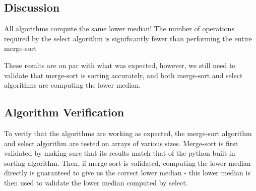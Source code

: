 \documentclass[11pt]{article}
\begin{document}
    \subsection{Discussion}\label{discussion}

All algorithms compute the same lower median! The number of operations
required by the select algorithm is significantly fewer than performing
the entire merge-sort

These results are on par with what was expected, however, we still need
to validate that merge-sort is sorting accurately, and both merge-sort
and select algorithms are computing the lower median.

\subsection{Algorithm Verification}\label{algorithm-verification}

To verify that the algorithms are working as expected, the merge-sort
algorithm and select algorithm are tested on arrays of various sizes.
Merge-sort is first validated by making sure that its results match that
of the python built-in sorting algorithm. Then, if merge-sort is
validated, computing the lower median directly is guaranteed to give us
the correct lower median - this lower median is then used to validate
the lower median computed by select.
\end{document}
